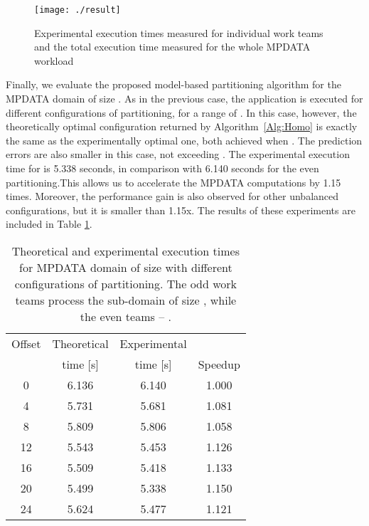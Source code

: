\documentclass{acm_proc_article-sp}
\begin{document}
\begin{figure}[h!]
\begin{center}
\texttt{[image: ./result]}
\caption{Experimental execution times measured for individual work teams and the total execution time measured for the whole MPDATA workload}
\label{fig:result}
\end{center}
\end{figure} 

Finally, we evaluate the proposed model-based partitioning algorithm for the MPDATA domain of size .
As in the previous case, the application is executed for different configurations of partitioning, for a range of .
In this case, however, the theoretically optimal configuration returned by Algorithm~\ref{Alg:Homo} is exactly  the same as the experimentally optimal one, both achieved when . 
The prediction errors are also smaller in this case, not exceeding . 
The experimental execution time for  is 5.338 seconds, in comparison with 6.140 seconds for the even partitioning.This allows us to accelerate the MPDATA computations by 1.15 times.
Moreover, the performance gain is also observed for other unbalanced configurations, but it is smaller than 1.15x. 
The results of these experiments are included in Table \ref{tab:480}.

\begin{table}[h]
\caption{Theoretical and experimental execution times for MPDATA domain of size  with different configurations of partitioning.
The odd work teams process the sub-domain of size , while the even teams -- .}
\label{tab:480}
\centering
\begin{tabular}{|c|c|c|c|}
\hline
Offset	&Theoretical	&	Experimental&		\\ 
	&time [s]	&	time [s]&	Speedup	\\ \hline 
0	&	6.136	&	6.140	&	1.000	\\ \hline
4	&	5.731	&	5.681	&	1.081	\\ \hline
8	&	5.809	&	5.806	&	1.058	\\ \hline
12	&	5.543	&	5.453	&	1.126	\\ \hline
16	&	5.509	&	5.418	&	1.133	\\ \hline
20	&	5.499	&	5.338	&	1.150	\\ \hline
24	&	5.624	&	5.477	&	1.121	\\ \hline
\end{tabular}
\end{table} 

 
\end{document}
